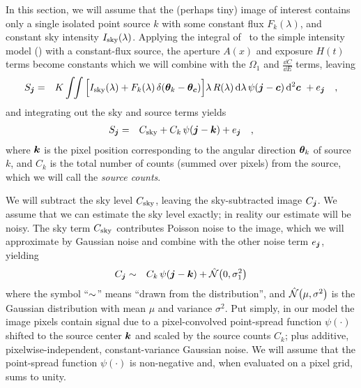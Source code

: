 In this section, we will assume that the (perhaps tiny) image of
interest contains only a single isolated point source $k$ with some
constant flux
$F_k(\lambda)$, and constant sky intensity $I_{\mathrm{sky}}(\lambda)$.
Applying the integral of \ to the simple intensity
model () with a constant-flux source, the
aperture $A(x)$ and exposure $H(t)$
terms become constants which we will combine with the $\Omega_1$ and
$\frac{\dd C}{\dd E}$ terms, leaving
\begin{eqnarray}\displaystyle
S_{\boldsymbol{j}} &=& K
\int \!\!
\int
\Big[
  I_{\mathrm{sky}}(\lambda) + F_k(\lambda)\,\delta(\boldsymbol{\theta}_k - \boldsymbol{\theta}_{\boldsymbol{c}})
\Big]
\lambda\,R(\lambda)\,
\mathrm{d}\lambda\,
\psi(\boldsymbol{j} - \boldsymbol{c})\,
\mathrm{d}^2 \boldsymbol{c}\
  + e_{\boldsymbol{j}} \quad ,
\end{eqnarray}
and integrating out the sky and source terms yields
\begin{eqnarray}\displaystyle
  S_{\boldsymbol{j}} &=& C_{\mathrm{sky}} + C_k \, \psi(\boldsymbol{j} - \boldsymbol{k})  + e_{\boldsymbol{j}} \quad ,
\end{eqnarray}
where $\boldsymbol{k}$ is the pixel position corresponding to the angular
direction $\boldsymbol{\theta}_k$ of source $k$, and $C_k$ is the total number
of counts (summed over pixels) from the source, which we will call the
\emph{source counts}.


We will subtract the sky level $C_{\mathrm{sky}}$, leaving the sky-subtracted
image $C_{\boldsymbol{j}}$.  We assume that we can estimate the sky level
exactly; in reality our estimate will be noisy.  The sky term
$C_{\mathrm{sky}}$ contributes Poisson noise to the image, which we will
approximate by Gaussian noise and combine with the other noise term
$e_{\boldsymbol{j}}$, yielding
\begin{eqnarray}\displaystyle
  C_{\boldsymbol{j}} &\sim& C_k \, \psi(\boldsymbol{j} - \boldsymbol{k}) + \hat{\mathcal{N}}\!\left(0,\sigma_1^2\right)
\label{eq:modelimg}
\end{eqnarray}
where the symbol ``$\sim$'' means ``drawn from the
distribution'', and $\hat{\mathcal{N}}\!\left(\mu,\sigma^2\right)$ is the Gaussian
distribution with mean $\mu$ and variance $\sigma^2$.  Put simply, in
our model the image pixels contain signal due to a pixel-convolved
point-spread function $\psi(\cdot)$ shifted to the source center
$\boldsymbol{k}$ and scaled by the source counts $C_k$; plus additive,
pixelwise-independent, constant-variance Gaussian noise.  We will
assume that the point-spread function $\psi(\cdot)$ is non-negative
and, when evaluated on a pixel grid, sums to unity.

